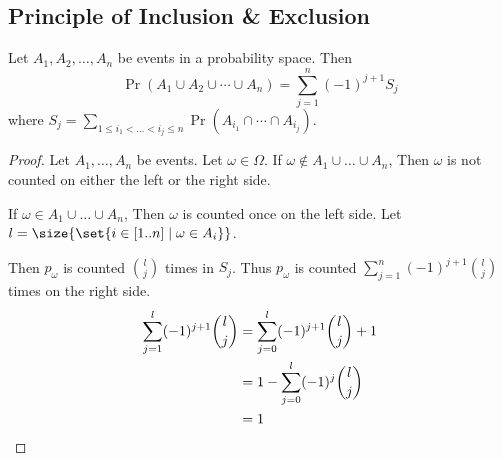 \subsection{Principle of Inclusion \& Exclusion} \label{sec:pie}
Let $A_1, A_2, \ldots, A_n$ be events in a probability space.
Then \[
    \Pr(A_1 \cup A_2 \cup \cdots \cup A_n) = \sum_{j = 1}^{n} (-1)^{j + 1} S_j
\] where $S_j = \sum_{1 \leq i_1 < \dots < i_j \leq n} \Pr(A_{i_1} \cap \cdots \cap A_{i_j})$.

\begin{proof}
    Let $A_1, \dots, A_{n}$ be events.
    Let $\omega \in \Omega$.
    If $\omega \notin A_1 \cup \dots \cup A_{n}$,
    Then $\omega$ is not counted on either the left or the right side.

    If $\omega \in A_1 \cup \dots \cup A_{n}$,
    Then $\omega$ is counted once on the left side.
    Let $l = \size{\set{i \in [1..n] \mid \omega \in A_i}}$.

    Then $p_\omega$ is counted $\binom{l}{j}$ times in $S_j$.
    Thus $p_\omega$ is counted $\sum_{j = 1}^{n} (-1)^{j + 1} \binom{l}{j}$ times on the right side.
    \begin{align*}
        \sum_{j = 1}^{l} (-1)^{j + 1} \binom{l}{j}
            &= \sum_{j = 0}^{l} (-1)^{j + 1} \binom{l}{j} + 1 \\
            &= 1 - \sum_{j = 0}^{l} (-1)^{j} \binom{l}{j} \\
            &= 1 \qedhere
    \end{align*}
\end{proof}

